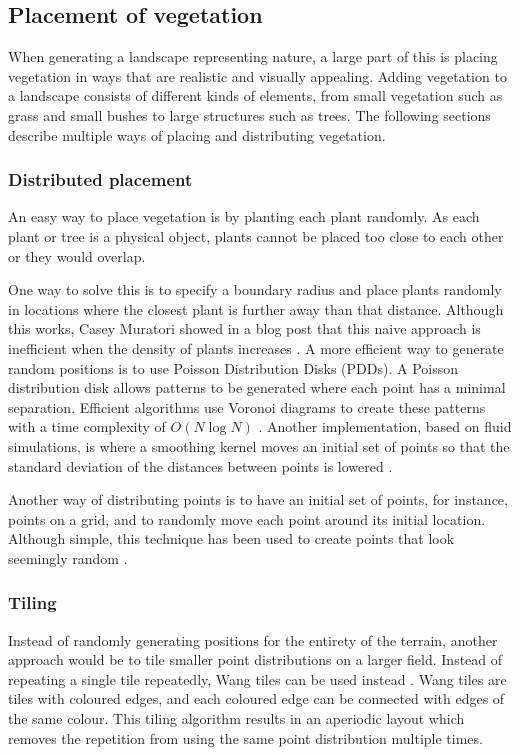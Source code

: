 \documentclass{article}
\begin{document}
\subsection{Placement of vegetation}
When generating a landscape representing nature, a large part of this is placing vegetation in ways that are realistic and visually appealing. Adding vegetation to a landscape consists of different kinds of elements, from small vegetation such as grass and small bushes to large structures such as trees. The following sections describe multiple ways of placing and distributing vegetation.

\subsubsection{Distributed placement}
An easy way to place vegetation is by planting each plant randomly. As each plant or tree is a physical object, plants cannot be placed too close to each other or they would overlap.

One way to solve this is to specify a boundary radius and place plants randomly in locations where the closest plant is further away than that distance. Although this works, Casey Muratori showed in a blog post that this naive approach is inefficient when the density of plants increases \cite{muratori_color_2014}. A more efficient way to generate random positions is to use Poisson Distribution Disks (PDDs). A Poisson distribution disk allows patterns to be generated where each point has a minimal separation. Efficient algorithms use Voronoi diagrams to create these patterns with a time complexity of $O(N \log{} N)$ \cite{jones_efficient_2006}. Another implementation, based on fluid simulations, is where a smoothing kernel moves an initial set of points so that the standard deviation of the distances between points is lowered \cite{jiang_blue_2015}.

Another way of distributing points is to have an initial set of points, for instance, points on a grid, and to randomly move each point around its initial location. Although simple, this technique has been used to create points that look seemingly random \cite{hammes_modeling_2001} \cite{van_muijden_gpu-based_2017}.

\subsubsection{Tiling}
Instead of randomly generating positions for the entirety of the terrain, another approach would be to tile smaller point distributions on a larger field. Instead of repeating a single tile repeatedly, Wang tiles can be used instead \cite{cohen_wang_2003}. Wang tiles are tiles with coloured edges, and each coloured edge can be connected with edges of the same colour. This tiling algorithm results in an aperiodic layout which removes the repetition from using the same point distribution multiple times.
\end{document}
